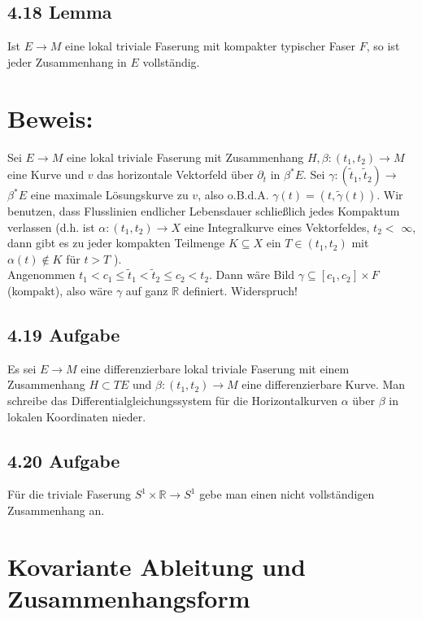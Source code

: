 \documentclass[10pt, letterpaper]{article}
\begin{document}
\subsection*{4.18 Lemma}
Ist $E \rightarrow M$ eine lokal triviale Faserung mit kompakter typischer Faser $F$, so ist jeder Zusammenhang in $E$ vollständig.

\section*{Beweis:}
Sei $E \rightarrow M$ eine lokal triviale Faserung mit Zusammenhang $H, \beta:\left(t_{1}, t_{2}\right) \rightarrow M$ eine Kurve und $v$ das horizontale Vektorfeld über $\partial_{t}$ in $\beta^{*} E$. Sei $\gamma:\left(\tilde{t}_{1}, \tilde{t}_{2}\right) \rightarrow$ $\beta^{*} E$ eine maximale Lösungskurve zu $v$, also o.B.d.A. $\gamma(t)=(t, \tilde{\gamma}(t))$. Wir benutzen, dass Flusslinien endlicher Lebensdauer schließlich jedes Kompaktum verlassen (d.h. ist $\alpha:\left(t_{1}, t_{2}\right) \rightarrow X$ eine Integralkurve eines Vektorfeldes, $t_{2}<$ $\infty$, dann gibt es zu jeder kompakten Teilmenge $K \subseteq X$ ein $T \in\left(t_{1}, t_{2}\right)$ mit $\alpha(t) \notin K$ für $t>T$ ).\\
Angenommen $t_{1}<c_{1} \leq \tilde{t}_{1}<\tilde{t}_{2} \leq c_{2}<t_{2}$. Dann wäre Bild $\gamma \subseteq\left[c_{1}, c_{2}\right] \times F$ (kompakt), also wäre $\gamma$ auf ganz $\mathbb{R}$ definiert. Widerspruch!

\subsection*{4.19 Aufgabe}
Es sei $E \rightarrow M$ eine differenzierbare lokal triviale Faserung mit einem Zusammenhang $H \subset T E$ und $\beta:\left(t_{1}, t_{2}\right) \rightarrow M$ eine differenzierbare Kurve. Man schreibe das Differentialgleichungssystem für die Horizontalkurven $\alpha$ über $\beta$ in lokalen Koordinaten nieder.

\subsection*{4.20 Aufgabe}
Für die triviale Faserung $S^{1} \times \mathbb{R} \rightarrow S^{1}$ gebe man einen nicht vollständigen Zusammenhang an.



\pagebreak

\section{Kovariante Ableitung und Zusammenhangsform}
\end{document}
